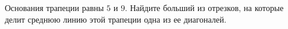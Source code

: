 \begin{ex}
	\begin{condition}
		Основания трапеции равны \( 5  \) и \( 9 \). Найдите больший из отрезков, на которые делит среднюю линию этой трапеции одна из ее диагоналей.
	\end{condition}
\end{ex}